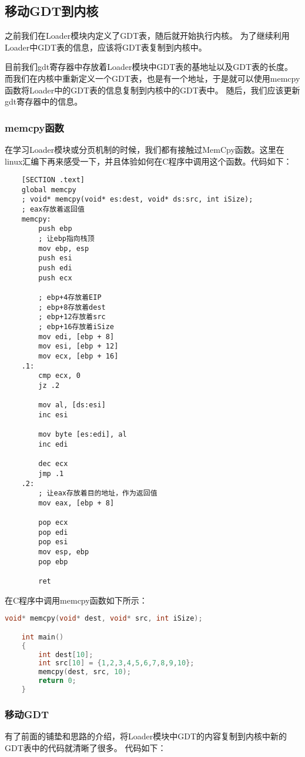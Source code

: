 \documentclass[a4paper,left=2.5cm,right=2.5cm,11pt]{article}
\begin{document}
\subsection{移动GDT到内核}
	之前我们在Loader模块内定义了GDT表，随后就开始执行内核。
	为了继续利用Loader中GDT表的信息，应该将GDT表复制到内核中。\par
	目前我们gdt寄存器中存放着Loader模块中GDT表的基地址以及GDT表的长度。
	而我们在内核中重新定义一个GDT表，也是有一个地址，于是就可以使用memcpy函数将Loader中的GDT表的信息复制到内核中的GDT表中。
	随后，我们应该更新gdt寄存器中的信息。

\subsubsection{memcpy函数}
	在学习Loader模块或分页机制的时候，我们都有接触过MemCpy函数。这里在linux汇编下再来感受一下，并且体验如何在C程序中调用这个函数。代码如下：
	\begin{lstlisting}
	[SECTION .text]
	global memcpy
	; void* memcpy(void* es:dest, void* ds:src, int iSize);
	; eax存放着返回值
	memcpy:
		push ebp
		; 让ebp指向栈顶
		mov ebp, esp
		push esi
		push edi
		push ecx

		; ebp+4存放着EIP
		; ebp+8存放着dest
		; ebp+12存放着src
		; ebp+16存放着iSize
		mov edi, [ebp + 8]
		mov esi, [ebp + 12]
		mov ecx, [ebp + 16]
	.1:
		cmp ecx, 0
		jz .2
		
		mov al, [ds:esi]
		inc esi

		mov byte [es:edi], al
		inc edi

		dec ecx
		jmp .1
	.2:
		; 让eax存放着目的地址，作为返回值
		mov eax, [ebp + 8]

		pop ecx
		pop edi
		pop esi
		mov esp, ebp
		pop ebp

		ret
	\end{lstlisting}

	在C程序中调用memcpy函数如下所示：
	\begin{lstlisting}[language = C]
	void* memcpy(void* dest, void* src, int iSize);

	int main()
	{
		int dest[10];
		int src[10] = {1,2,3,4,5,6,7,8,9,10};
		memcpy(dest, src, 10);
		return 0;
	}
	\end{lstlisting}

\subsubsection{移动GDT}
	有了前面的铺垫和思路的介绍，将Loader模块中GDT的内容复制到内核中新的GDT表中的代码就清晰了很多。
	代码如下：
\end{document}
